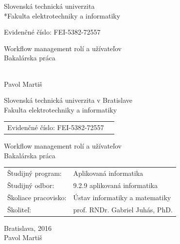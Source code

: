 \documentclass[12pt, oneside]{book}
\def\mfrok{2016}
\def\mfnazov{Workflow management rolí a užívateľov}
\def\mftyp{Bakalárska práca}
\def\mfautor{Pavol Martiš}
\def\mfskolitel{prof. RNDr. Gabriel Juhás, PhD.}
\def\mfevidenceneCislo{FEI-5382-72557}
\def\mfkonzultant{tit. Meno Priezvisko, tit. }
\def\mfmiesto{Bratislava, \mfrok}
\def\mfodbor{ 9.2.9 aplikovaná informatika }
\def\program{ Aplikovaná informatika }
\def\mfpracovisko{ Ústav informatiky a matematiky }
\begin{document}
     
\pagestyle{empty}
\thispagestyle{empty}

\begin{center}
\sc\large
Slovenská technická univerzita
\\*Fakulta elektrotechniky a informatiky\\
\end{center}


{	
	Evidenčné číslo: \mfevidenceneCislo
	\noindent 
}

\vfill
\begin{center}
{\LARGE\mfnazov}\\
\Large\mftyp
\end{center}

\vfill

{\sc\large 
\noindent \mfrok\\
\mfautor
}

\eject %


\thispagestyle{empty}
\noindent

\begin{center}
\sc  
\large
Slovenská technická univerzita v Bratislave\\
Fakulta elektrotechniky a informatiky\\
\end{center}
\begin{tabular}{ll}
Evidenčné číslo: \mfevidenceneCislo
\end{tabular}

\vfill

\begin{center}
{\LARGE\mfnazov}\\
\Large \mftyp
\end{center}

\vfill

\noindent
\begin{tabular}{ll}
Študijný program: & \program \\
Študijný odbor: & \mfodbor \\
Školiace pracovisko: & \mfpracovisko \\
Školiteľ: & \mfskolitel \\
\end{tabular}

\vfill


\noindent \mfmiesto\\
\mfautor
\end{document}
